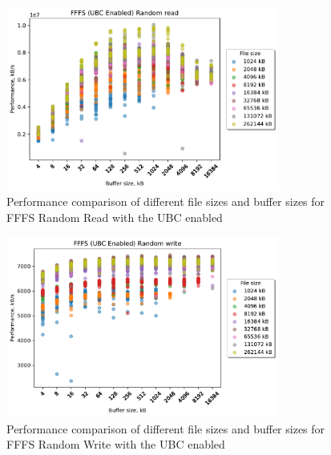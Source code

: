 \begin{figure}[!htb]
	\label{fig:bench_fffs_ubc_scatter_rnd_read}
	\begin{center}
		\includegraphics[width=0.8\textwidth]{figures.nosync/benchmarking/FFFS/scatter-UBC Enabled-Random read.pdf}
	\end{center}
	\caption[Comparison of Random Read performance for file size and buffer size for FFFS with the UBC enabled]{Performance comparison of different file sizes and buffer sizes for FFFS Random Read with the UBC enabled}
\end{figure}
\begin{figure}[!htb]
	\label{fig:bench_fffs_ubc_scatter_rnd_write}
	\begin{center}
		\includegraphics[width=0.8\textwidth]{figures.nosync/benchmarking/FFFS/scatter-UBC Enabled-Random write.pdf}
	\end{center}
	\caption[Comparison of Random Write performance for file size and buffer size for FFFS with the UBC enabled]{Performance comparison of different file sizes and buffer sizes for FFFS Random Write with the UBC enabled}
\end{figure}
\clearpage



